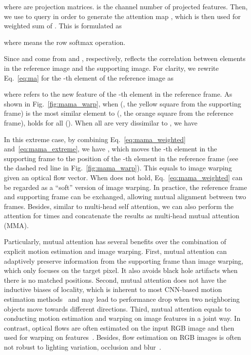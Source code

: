 \documentclass[10pt,twocolumn,letterpaper]{article}
\newlength \g
\begin{document}
where  are projection matrices.  is the channel number of projected features. Then, we use  to query  in order to generate the attention map , which is then used for weighted sum of . This is formulated as

where  means the row softmax operation.

Since  and  come from  and , respectively,  reflects the correlation between elements in the reference image and the supporting image. For clarity, we rewrite Eq.~\eqref{eq:ma} for the -th element of the reference image as

where  refers to the new feature of the -th element in the reference frame. As shown in Fig.~\ref{fig:mama_warp}, when  (\eg, the yellow square from the supporting frame) is the most similar element to  (\eg, the orange square from the reference frame),  holds for all  (). When all  are very dissimilar to , we have 


In this extreme case, by combining Eq.~\eqref{eq:mama_weighted} and~\eqref{eq:mama_extreme}, we have , which moves the -th element in the supporting frame to the position of the -th element in the reference frame (see the dashed red line in Fig.~\ref{fig:mama_warp}). This equals to image warping given an optical flow vector. When  does not hold, Eq.~\eqref{eq:mama_weighted} can be regarded as a ``soft'' version of image warping. In practice, the reference frame and supporting frame can be exchanged, allowing mutual alignment between two frames. Besides, similar to multi-head self attention, we can also perform the attention for  times and concatenate the results as multi-head mutual attention (MMA).

Particularly, mutual attention has several benefits over the combination of explicit motion estimation and image warping. First, mutual attention can adaptively preserve information from the supporting frame than image warping, which only focuses on the target pixel. It also avoids black hole artifacts when there is no matched positions. Second, mutual attention does not have the inductive biases of locality, which is inherent to most CNN-based motion estimation methods~\cite{dosovitskiy2015flownet, ranjan2017spynet,pytorch-spynet, sun2018pwc} and may lead to performance drop when two neighboring objects move towards different directions. Third, mutual attention equals to conducting motion estimation and warping on image features in a joint way. In contrast, optical flows are often estimated on the input RGB image and then used for warping on features~\cite{chan2021basicvsr, chan2021basicvsr++}. Besides, flow estimation on RGB images is often not robust to lighting variation, occlusion and blur~\cite{xue2019TOFlow-Vimeo-90K}.
\end{document}
